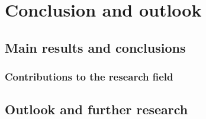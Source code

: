 \chapter{Conclusion and outlook}
\label{ch:conclusions}


\section{Main results and conclusions}


\subsection{Contributions to the research field}


\section{Outlook and further research}

